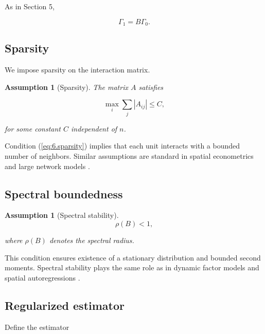 \documentclass[12pt]{article}
\numberwithin{equation}{section}
\newtheorem{assumption}[theorem]{Assumption}
\begin{document}
As in Section 5,

\begin{equation}
\Gamma_1
=
B \Gamma_0.
\label{eq:6.restriction}
\end{equation}

\subsection{Sparsity}

We impose sparsity on the interaction matrix.

\begin{assumption}[Sparsity]
The matrix $A$ satisfies

\begin{equation}
\max_i
\sum_j
|A_{ij}|
\le
C,
\label{eq:6.sparsity}
\end{equation}

for some constant $C$ independent of $n$.
\end{assumption}

Condition (\ref{eq:6.sparsity}) implies that each unit interacts with a bounded
number of neighbors. Similar assumptions are standard in spatial econometrics
and large network models
\citep{anselin1988spatial, chandrasekhar2016econometrics}.

\subsection{Spectral boundedness}

\begin{assumption}[Spectral stability]

\begin{equation}
\rho(B) < 1,
\label{eq:6.stability}
\end{equation}

where $\rho(B)$ denotes the spectral radius.

\end{assumption}

This condition ensures existence of a stationary distribution and bounded
second moments. Spectral stability plays the same role as in dynamic factor
models and spatial autoregressions
\citep{bai2003inferential, hamilton1994timeseries}.

\subsection{Regularized estimator}

Define the estimator
\end{document}
